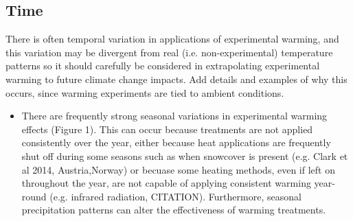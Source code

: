 \documentclass{article}
\begin{document}
\subsection {Time}
There is often temporal variation in applications of experimental warming, and this variation may be divergent from real (i.e. non-experimental) temperature patterns so it should carefully be considered in extrapolating experimental warming to future climate change impacts. Add details and examples of why this occurs, since warming experiments are tied to ambient conditions. 
\begin{itemize}
\item There are frequently strong seasonal variations in experimental warming effects (Figure 1). This can occur because treatments are not applied consistently over the year, either because heat applications are frequently shut off during some seasons such as when snowcover is present (e.g. Clark et al 2014, Austria,Norway) or becuase some heating methods, even if left on throughout the year, are not capable of applying consistent warming year-round (e.g. infrared radiation, CITATION). Furthermore, seasonal precipitation patterns can alter the effectiveness of warming treatments. %


\end{itemize}
\end{document}
